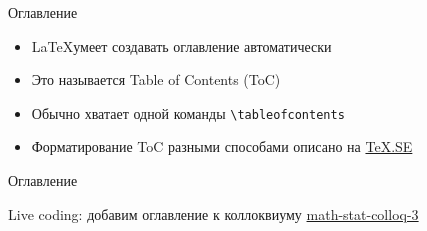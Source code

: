 
\begin{frame}[fragile]{Оглавление}

\begin{itemize}
    \item \LaTeX \enspace умеет создавать оглавление автоматически
    \item Это называется Table of Contents (ToC)
    \item Обычно хватает одной команды \lstinline!\tableofcontents!
    \item Форматирование ToC разными способами описано на
    \href{https://tex.stackexchange.com/questions/157396/formatting-of-the-table-of-contents}{\color{blue} TeX.SE}
\end{itemize}

\end{frame}


\begin{frame}[fragile]{Оглавление}

Live coding: добавим оглавление к коллоквиуму
\href{https://www.overleaf.com/read/mfjnfzfpwppj}{\color{blue} math-stat-colloq-3}

\end{frame}
